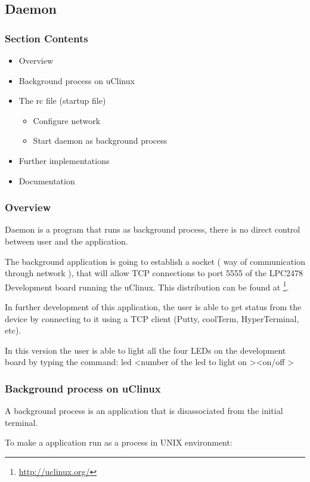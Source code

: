 \subsection{Daemon}
\subsubsection{Section Contents}
\begin{itemize}
	\item Overview
	\item Background process on uClinux
	\item The rc file (startup file)
	\begin{itemize}
		\item Configure network
		\item Start daemon as background process
	\end{itemize}
	\item Further implementations
	\item Documentation
\end{itemize}

\subsubsection{Overview}
Daemon is a program that runs as background process, there is no direct control between user and the application.

The background application is going to establish a socket ( way of communication through network ), that will allow TCP connections to port 5555 of the LPC2478 Development board running the uClinux. This distribution can be found at \footnote{\url{http://uclinux.org/}}.

In further development of this application, the user is able to get status from the device by connecting to it using a TCP client (Putty, coolTerm, HyperTerminal, etc).

In this version the user is able to light all the four LEDs on the development board by typing the command: led \textless number of the led to light on \textgreater  \textless on/off \textgreater

\subsubsection{Background process on uClinux}
A background process is an application that is disassociated from the initial terminal. 

To make a application run as a process in UNIX environment:

